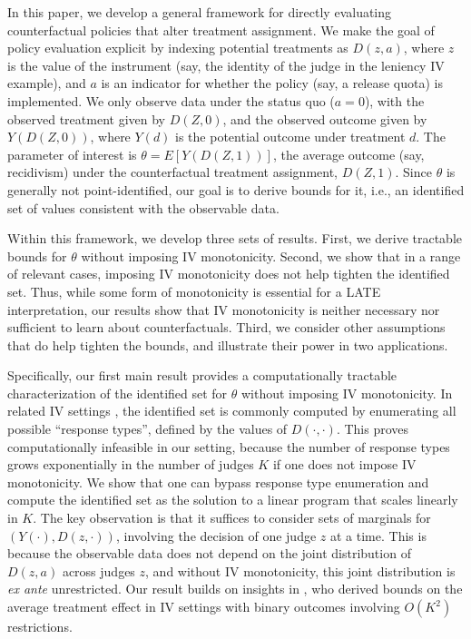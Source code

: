 \documentclass[12pt]{article}%
\theoremstyle{definition}
\newcommand\1{\operatorname{I}\indicatorfence}
\begin{document}
In this paper, we develop a general framework for directly evaluating
counterfactual policies that alter treatment assignment. We make the goal of
policy evaluation explicit by indexing potential treatments as $D(z, a)$, where
$z$ is the value of the instrument (say, the identity of the judge in the leniency IV
example), and $a$ is an indicator for whether the policy (say, a release quota) is implemented. We only observe data under the status quo ($a=0$), with
the observed treatment given by $D(Z, 0)$, and the observed outcome given by $Y(D(Z,0))$, where $Y(d)$ is the potential outcome under treatment $d$. The parameter of interest is $\theta = E[Y(D(Z,1))]$, the average outcome (say, recidivism) under the
counterfactual treatment assignment, $D(Z,1)$. Since $\theta$ is generally not
point-identified, our goal is to derive bounds for it, i.e., an identified set
of values consistent with the observable data.

Within this framework, we develop three sets of results. First, we derive
tractable bounds for $\theta$ without imposing IV monotonicity. Second, we show
that in a range of relevant cases, imposing IV monotonicity does not help
tighten the identified set. Thus, while some form of monotonicity is essential
for a \ac{LATE} interpretation, our results show that IV monotonicity is neither
necessary nor sufficient to learn about counterfactuals. Third, we consider
other assumptions that do help tighten the bounds, and illustrate their power in
two applications.

Specifically, our first main result provides a computationally tractable characterization of the identified set for $\theta$ without imposing IV monotonicity. In related \ac{IV} settings \parencite[e.g.][]{kitagawa21, bai_identifying_2024}, the identified set is commonly computed by
enumerating all possible ``response types'', defined by the values of
$D(\cdot, \cdot)$. This proves computationally infeasible in our setting, because
the number of response types grows exponentially in the number of judges $K$ if
one does not impose \ac{IV} monotonicity. We show that one can bypass response
type enumeration and compute the identified set as the solution to a linear
program that scales linearly in $K$. The key observation is that it suffices to
consider sets of marginals for $(Y(\cdot), D(z, \cdot))$, involving the decision
of one judge $z$ at a time. This is because the observable data does not depend
on the joint distribution of $D(z, a)$ across judges $z$, and without
\ac{IV} monotonicity, this joint distribution is \emph{ex ante} unrestricted. Our result builds on insights in \textcite{RiRo14}, who derived bounds on the average treatment effect in IV settings with binary outcomes involving $O(K^2)$ restrictions.
\end{document}
